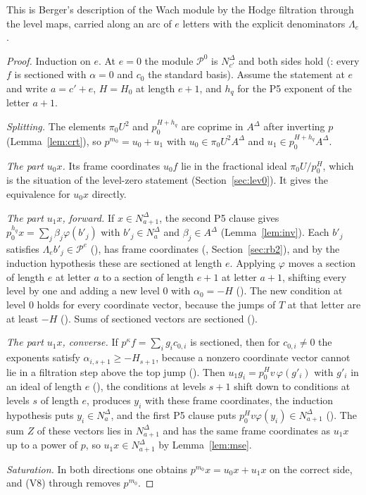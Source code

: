 \documentclass[11pt]{article}
\newcommand{\NN}{N^{\Delta}}
\newcommand{\Pp}{\mathcal P}
\theoremstyle{definition}
\theoremstyle{remark}
\begin{document}
This is Berger's description of the Wach module by the Hodge filtration through the level maps, carried along an arc of $e$ letters with the explicit denominators $\Lambda_e$.

\begin{proof}
Induction on $e$. At $e=0$ the module $\Pp^0$ is $\NN_{c'}$ and both sides hold (: every $f$ is sectioned with $\alpha=0$ and $c_0$ the standard basis). Assume the statement at $e$ and write $a=c'+e$, $H=H_0$ at length $e+1$, and $h_q$ for the P5 exponent of the letter $a+1$.

\emph{Splitting.} The elements $\pi_0U^2$ and $p_0^{H+h_q}$ are coprime in $A^\Delta$ after inverting $p$ (Lemma~\ref{lem:crt}), so $p^{m_0}=u_0+u_1$ with $u_0\in\pi_0U^2A^\Delta$ and $u_1\in p_0^{H+h_q}A^\Delta$.

\emph{The part $u_0x$.} Its frame coordinates $u_0f$ lie in the fractional ideal $\pi_0U/p_0^{H}$, which is the situation of the level-zero statement  (Section~\ref{sec:lev0}). It gives the equivalence for $u_0x$ directly.

\emph{The part $u_1x$, forward.} If $x\in\NN_{a+1}$, the second P5 clause gives $p_0^{h_q}x=\sum_j\beta_j\varphi(b'_j)$ with $b'_j\in\NN_a$ and $\beta_j\in A^\Delta$ (Lemma~\ref{lem:inv}). Each $b'_j$ satisfies $\Lambda_eb'_j\in\Pp^e$ (), has frame coordinates (, Section~\ref{sec:rb2}), and by the induction hypothesis these are sectioned at length $e$. Applying $\varphi$ moves a section of length $e$ at letter $a$ to a section of length $e+1$ at letter $a+1$, shifting every level by one and adding a new level $0$ with $\alpha_0=-H$ (). The new condition at level $0$ holds for every coordinate vector, because the jumps of $T$ at that letter are at least $-H$ (). Sums of sectioned vectors are sectioned ().

\emph{The part $u_1x$, converse.} If $p^\kappa f=\sum_ig_ic_{0,i}$ is sectioned, then for $c_{0,i}\ne0$ the exponents satisfy $\alpha_{i,s+1}\ge-H_{s+1}$, because a nonzero coordinate vector cannot lie in a filtration step above the top jump (). Then $u_1g_i=p_0^{H}v\,\varphi(g'_i)$ with $g'_i$ in an ideal of length $e$ (), the conditions at levels $s+1$ shift down to conditions at levels $s$ of length $e$,  produces $y_i$ with these frame coordinates, the induction hypothesis puts $y_i\in\NN_a$, and the first P5 clause puts $p_0^{H}v\varphi(y_i)\in\NN_{a+1}$ (). The sum $Z$ of these vectors lies in $\NN_{a+1}$ and has the same frame coordinates as $u_1x$ up to a power of $p$, so $u_1x\in\NN_{a+1}$ by Lemma~\ref{lem:mse}.

\emph{Saturation.} In both directions one obtains $p^{m_0}x=u_0x+u_1x$ on the correct side, and  (V8) through  removes $p^{m_0}$.
\end{proof}
\end{document}
